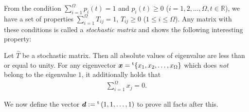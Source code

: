 From the condition $\sum_{i=1}^{\Omega}p_{i}(t)=1$ and $p_{i}(t) \ge 0$ ($i=1,2,\dots,\Omega, t\in\mathbb{R}$), we have a set of properties $\sum_{i=1}^{\Omega}T_{ij} = 1$, $T_{ij}\ge 0$ ($1\leq i\leq \Omega$). Any matrix with these conditions is called a \textit{stochastic matrix} and shows the following interesting property:
\begin{lemma}
	Let $\hat{T}$ be a stochastic matrix. Then all absolute values of eigenvalue are less than or equal to unity. For any eigenvector $\bm{x}={}^{\rm t}\{x_{1},x_{2},\dots,x_{\Omega}\}$ which does \textit{not} belong to the eigenvalue $1$, it additionally holds that
	\begin{align}
	\sum_{i=1}^{\Omega}x_{j}=0.
	\end{align}
\end{lemma}
We now define the vector $\bm{d}:={}^{\rm t}\left(1,1,\dots,1\right)$ to prove all facts after this.
